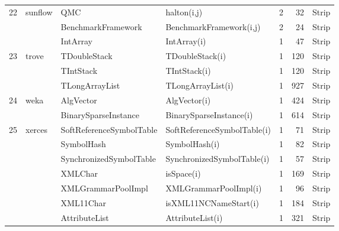 \begin{table}[H]
{{\begin{tabular}{|l|l|l|l|r|r|c|}
22	&	sunflow		& QMC					& halton(i,j)				& 2			& 32	& Strip  										\\ 
	&				& BenchmarkFramework	& BenchmarkFramework(i,j) & 2		& 24	& Strip   										\\ 
	&				& IntArray				& IntArray(i)				& 1			& 47	& Strip 										\\ 	
23	&	trove		& TDoubleStack			& TDoubleStack(i)		& 1			& 120	& Strip  										\\ 
	&				& TIntStack				& TIntStack(i)			& 1			& 120	& Strip  										\\ 
	&				& TLongArrayList			& TLongArrayList(i)		& 1			& 927	& Strip  										\\ 
24	&	weka		& AlgVector				& AlgVector(i)			& 1			& 424	& Strip  										\\ 
	&				& BinarySparseInstance	& BinarySparseInstance(i)  & 1			& 614	& Strip 										\\ 
25	&	xerces		& SoftReferenceSymbolTable& SoftReferenceSymbolTable(i) & 1	& 71	& Strip  										\\ 
	&				& SymbolHash			& SymbolHash(i)			& 1			& 82	& Strip 										\\ 
	&				& SynchronizedSymbolTable& SynchronizedSymbolTable(i) & 1	& 57	& Strip  										\\ 
	&				& XMLChar				& isSpace(i)				& 1			& 169	& Strip 										\\ 
	&				& XMLGrammarPoolImpl	& XMLGrammarPoolImpl(i)	& 1			& 96	& Strip   										\\ 
	&				& XML11Char			& isXML11NCNameStart(i)	& 1			& 184	& Strip  										\\ 
	&				& AttributeList			& AttributeList(i)			& 1			& 321	& Strip  										\\ 
\hline

\end{tabular}
}
}
\bigskip
\label{table:packages}
\end{table}











































